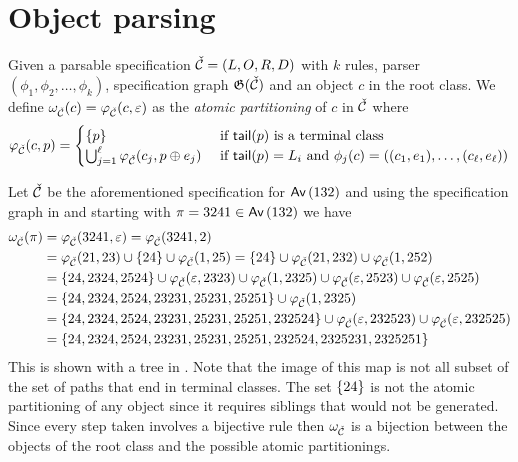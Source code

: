 \section{Object parsing}
Given a parsable specification $\check{\mathcal{C}} = (L,O,R,D)$ with $k$ rules, parser $(\phi_1,\phi_2,\dotsc,\phi_k)$, specification graph $\mathfrak{G}(\check{\mathcal{C}})$ and an object $c$ in the root class. We define $\omega_{\check{\mathcal{C}}}(c) = \varphi_{\check{\mathcal{C}}}(c,\varepsilon)$ as the \emph{atomic partitioning} of $c$ in $\check{\mathcal{C}}$ where \[
    \varphi_{\check{\mathcal{C}}}(c,p) = \begin{cases}
        \left\{p\right\} & \text{ if } \textsf{tail}(p) \text{ is a terminal class}\\
        \bigcup_{j=1}^\ell\varphi_{\check{\mathcal{C}}}(c_j,p \oplus e_j) & \text{ if }
        \textsf{tail}(p) = L_i \text{ and } \phi_j(c) = ((c_1,e_1),\dotsc,(c_\ell,e_\ell))
    \end{cases}
\]

Let $\check{\mathcal{C}}$ be the aforementioned specification for $\textsf{Av}\left(132\right)$ and using the specification graph in  and starting with $\pi=3241 \in \textsf{Av}\left(132\right)$ we have
\begin{align*}
    \omega_{\check{\mathcal{C}}}(\pi) &= \varphi_{\check{\mathcal{C}}}(3241,\varepsilon)
    = \varphi_{\check{\mathcal{C}}}(3241, 2) \\
    &= \varphi_{\check{\mathcal{C}}}(21,23) \cup \left\{24\right\} \cup \varphi_{\check{\mathcal{C}}}(1,25)
    = \left\{24\right\} \cup \varphi_{\check{\mathcal{C}}}(21,232) \cup \varphi_{\check{\mathcal{C}}}(1,252) \\
    &= \left\{24, 2324, 2524\right\} \cup \varphi_{\check{\mathcal{C}}}(\varepsilon,2323) \cup \varphi_{\check{\mathcal{C}}}(1,2325) \cup \varphi_{\check{\mathcal{C}}}(\varepsilon, 2523) \cup  \varphi_{\check{\mathcal{C}}}(\varepsilon, 2525) \\
    &= \left\{24, 2324, 2524, 23231, 25231, 25251\right\} \cup \varphi_{\check{\mathcal{C}}}(1,2325) \\
    &= \left\{24, 2324, 2524, 23231, 25231, 25251, 232524\right\} \cup \varphi_{\check{\mathcal{C}}}(\varepsilon,232523) \cup \varphi_{\check{\mathcal{C}}}(\varepsilon,232525) \\
    &= \left\{24, 2324, 2524, 23231, 25231, 25251, 232524,2325231,2325251\right\}
\end{align*}
This is shown with a tree in . Note that the image of this map is not all subset of the set of paths that end in terminal classes. The set $\left\{24\right\}$ is not the atomic partitioning of any object since it requires siblings that would not be generated. Since every step taken involves a bijective rule then $\omega_{\check{\mathcal{C}}}$ is a bijection between the objects of the root class and the possible atomic partitionings.

